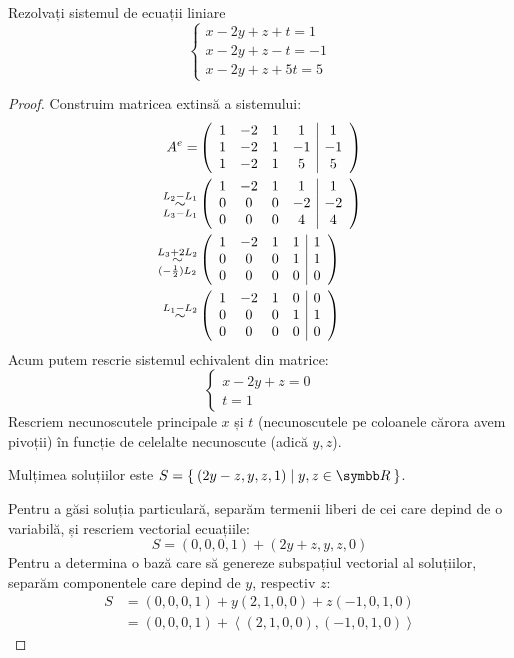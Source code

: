 \begin{exercise}[213]
Rezolvați sistemul de ecuații liniare
\[
    \begin{cases}
    x - 2y + z + t = 1 \\
    x - 2y + z - t = -1 \\
    x - 2y + z + 5t = 5
    \end{cases}
\]
\end{exercise}
\begin{proof}
Construim matricea extinsă a sistemului:
\begin{align*}
    A^e = &\left(
    \begin{array}{cccc|c}
    1 & -2 & 1 & 1 & 1 \\
    1 & -2 & 1 & -1 & -1 \\
    1 & -2 & 1 & 5 & 5
    \end{array}
    \right) \\
    \operatorname*{\sim}^{L_2 - L_1}_{L_3 - L_1}
    &\left(
    \begin{array}{cccc|c}
    1 & -2 & 1 & 1 & 1 \\
    0 & 0 & 0 & -2 & -2 \\
    0 & 0 & 0 & 4 & 4
    \end{array}
    \right)
    \\
    \operatorname*{\sim}^{L_3 + 2 L_2}_{(-\frac{1}{2}) L_2}
    &\left(\begin{array}{cccc|c}
    1 & -2 & 1 & 1 & 1 \\
    0 & 0 & 0 & 1 & 1 \\
    0 & 0 & 0 & 0 & 0
    \end{array}\right)
    \\
    \operatorname*{\sim}^{L_1 - L_2}
    &\left(\begin{array}{cccc|c}
    1 & -2 & 1 & 0 & 0 \\
    0 & 0 & 0 & 1 & 1 \\
    0 & 0 & 0 & 0 & 0
    \end{array}\right)
\end{align*}
Acum putem rescrie sistemul echivalent din matrice:
\[
\begin{cases}
x - 2y + z = 0 \\
t = 1
\end{cases}
\]
Rescriem necunoscutele principale \(x\) și \(t\) (necunoscutele pe coloanele cărora avem pivoții) în funcție de celelalte necunoscute (adică \(y, z\)).

Mulțimea soluțiilor este \(S = \Set{ (2y - z, y, z, 1) | y, z \in \reals}\).

Pentru a găsi soluția particulară, separăm termenii liberi de cei care depind de o variabilă, și rescriem vectorial ecuațiile:
\[
    S = (0, 0, 0, 1) + (2y + z, y, z, 0)
\]
Pentru a determina o bază care să genereze subspațiul vectorial al soluțiilor, separăm componentele care depind de \(y\), respectiv \(z\):
\begin{align*}
    S &= (0, 0, 0, 1) + y(2, 1, 0, 0) + z (-1, 0, 1, 0) \\
    &= (0, 0, 0, 1) + \left\langle (2, 1, 0, 0), (-1, 0, 1, 0) \right\rangle
\end{align*}
\end{proof}

